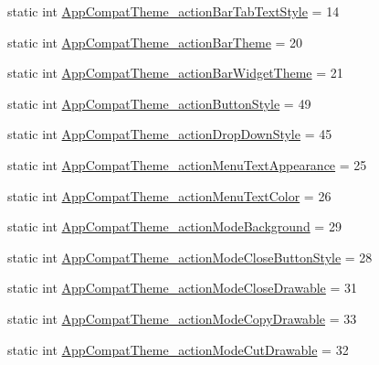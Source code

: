 \begin{DoxyCompactItemize}
\item 
static int \hyperlink{classandroid_1_1support_1_1v7_1_1appcompat_1_1R_1_1styleable_a82190f5955d5a7de45c6d9213d167e18}{App\+Compat\+Theme\+\_\+action\+Bar\+Tab\+Text\+Style} = 14
\item 
static int \hyperlink{classandroid_1_1support_1_1v7_1_1appcompat_1_1R_1_1styleable_ad2fa65ea8877e20263573e6421d9984a}{App\+Compat\+Theme\+\_\+action\+Bar\+Theme} = 20
\item 
static int \hyperlink{classandroid_1_1support_1_1v7_1_1appcompat_1_1R_1_1styleable_ab810dc14bfe475a34217707ee6129736}{App\+Compat\+Theme\+\_\+action\+Bar\+Widget\+Theme} = 21
\item 
static int \hyperlink{classandroid_1_1support_1_1v7_1_1appcompat_1_1R_1_1styleable_aed2e837f0d6e11a7654cf7d92cff7596}{App\+Compat\+Theme\+\_\+action\+Button\+Style} = 49
\item 
static int \hyperlink{classandroid_1_1support_1_1v7_1_1appcompat_1_1R_1_1styleable_abba2b1805131f8a438a2d7071f72f61c}{App\+Compat\+Theme\+\_\+action\+Drop\+Down\+Style} = 45
\item 
static int \hyperlink{classandroid_1_1support_1_1v7_1_1appcompat_1_1R_1_1styleable_a08537df420a6180fa4bf7a612fafbef4}{App\+Compat\+Theme\+\_\+action\+Menu\+Text\+Appearance} = 25
\item 
static int \hyperlink{classandroid_1_1support_1_1v7_1_1appcompat_1_1R_1_1styleable_a7d660534f3eac2be993592cc73cf7d82}{App\+Compat\+Theme\+\_\+action\+Menu\+Text\+Color} = 26
\item 
static int \hyperlink{classandroid_1_1support_1_1v7_1_1appcompat_1_1R_1_1styleable_ab3232a346cf79317002a4865cfc6b8bc}{App\+Compat\+Theme\+\_\+action\+Mode\+Background} = 29
\item 
static int \hyperlink{classandroid_1_1support_1_1v7_1_1appcompat_1_1R_1_1styleable_a75da0b6bb36190916e35341ab687f5f2}{App\+Compat\+Theme\+\_\+action\+Mode\+Close\+Button\+Style} = 28
\item 
static int \hyperlink{classandroid_1_1support_1_1v7_1_1appcompat_1_1R_1_1styleable_ae9cbb0f39b930724e55c613214e2ed19}{App\+Compat\+Theme\+\_\+action\+Mode\+Close\+Drawable} = 31
\item 
static int \hyperlink{classandroid_1_1support_1_1v7_1_1appcompat_1_1R_1_1styleable_a956a19fc927aa002ea6418adb5800157}{App\+Compat\+Theme\+\_\+action\+Mode\+Copy\+Drawable} = 33
\item 
static int \hyperlink{classandroid_1_1support_1_1v7_1_1appcompat_1_1R_1_1styleable_abc2c7e57c9ef4bef8e58499d58c8e550}{App\+Compat\+Theme\+\_\+action\+Mode\+Cut\+Drawable} = 32

\end{DoxyCompactItemize}
